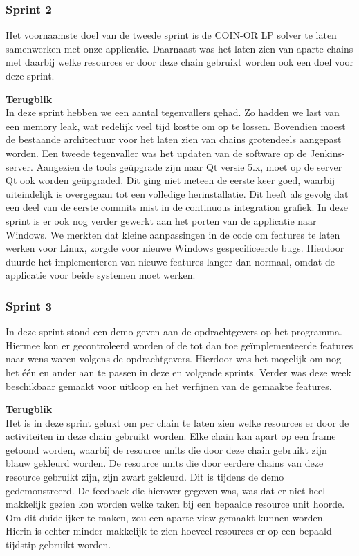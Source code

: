 \subsubsection{Sprint 2}
Het voornaamste doel van de tweede sprint is de COIN-OR LP solver te laten samenwerken met onze applicatie. Daarnaast was het laten zien van aparte chains met daarbij welke resources er door deze chain gebruikt worden ook een doel voor deze sprint. 

\textbf{Terugblik} \\
In deze sprint hebben we een aantal tegenvallers gehad. Zo hadden we last van een memory leak, wat redelijk veel tijd kostte om op te lossen. Bovendien moest de bestaande architectuur voor het laten zien van chains grotendeels aangepast worden. Een tweede tegenvaller was het updaten van de software op de Jenkins-server. Aangezien de tools ge\"upgrade zijn naar Qt versie 5.x, moet op de server Qt ook worden ge\"upgraded. Dit ging niet meteen de eerste keer goed, waarbij uiteindelijk is overgegaan tot een volledige herinstallatie. Dit heeft als gevolg dat een deel van de eerste commits mist in de continuous integration grafiek. In deze sprint is er ook nog verder gewerkt aan het porten van de applicatie naar Windows. We merkten dat kleine aanpassingen in de code om features te laten werken voor Linux, zorgde voor nieuwe Windows gespecificeerde bugs. Hierdoor duurde het implementeren van nieuwe features langer dan normaal, omdat de applicatie voor beide systemen moet werken.

\subsubsection{Sprint 3}
In deze sprint stond een demo geven aan de opdrachtgevers op het programma. Hiermee kon er gecontroleerd worden of de tot dan toe ge\"implementeerde features naar wens waren volgens de opdrachtgevers. Hierdoor was het mogelijk om nog het \'e\'en en ander aan te passen in deze en volgende sprints. Verder was deze week beschikbaar gemaakt voor uitloop en het verfijnen van de gemaakte features.

\textbf{Terugblik} \\
Het is in deze sprint gelukt om per chain te laten zien welke resources er door de activiteiten in deze chain gebruikt worden. Elke chain kan apart op een frame getoond worden, waarbij de resource units die door deze chain gebruikt zijn blauw gekleurd worden. De resource units die door eerdere chains van deze resource gebruikt zijn, zijn zwart gekleurd. Dit is tijdens de demo gedemonstreerd. De feedback die hierover gegeven was, was dat er niet heel makkelijk gezien kon worden welke taken bij een bepaalde resource unit hoorde. Om dit duidelijker te maken, zou een aparte view gemaakt kunnen worden. Hierin is echter minder makkelijk te zien hoeveel resources er op een bepaald tijdstip gebruikt worden.

